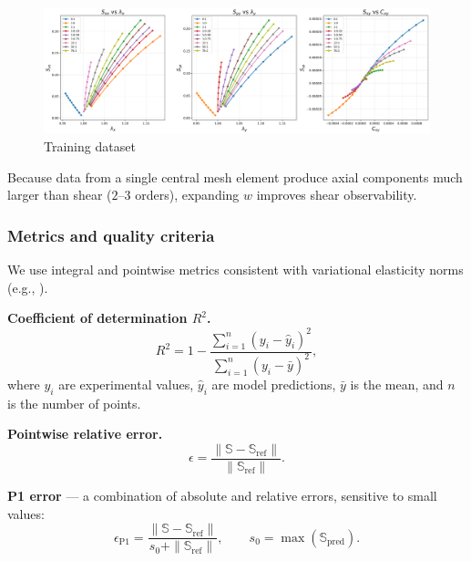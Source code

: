 \begin{figure}[H]
  \centering
\includegraphics[width=1.0\textwidth]{../img/all_stress_plots.png}
\caption{Training dataset}
  \label{fig:training_data}
\end{figure}

Because data from a single central mesh element produce axial components much larger than shear ($2$--$3$ orders), expanding $w$ improves shear observability.

\subsubsection{Metrics and quality criteria}
\label{sec:metrics}

We use integral and pointwise metrics consistent with variational elasticity norms (e.g., \cite{ciarlet1988mathematical,ogden1997nonlinear,holzapfel2000nonlinear}).

\textbf{Coefficient of determination $R^2$.}
\begin{equation}\label{eq:r_squared}
  R^2 = 1 - \frac{\sum_{i=1}^n (y_i - \hat{y}_i)^2}{\sum_{i=1}^n (y_i - \bar{y})^2},
\end{equation}
where $y_i$ are experimental values, $\hat{y}_i$ are model predictions, $\bar{y}$ is the mean, and $n$ is the number of points.

\textbf{Pointwise relative error.}
\begin{equation}\label{eq:rel_error}
  \epsilon = \frac{\| \mathbb S - \mathbb S_{\text{ref}} \|}{\| \mathbb S_{\text{ref}} \|}.
\end{equation}

\textbf{P1 error} \cite{xie2024p1} — a combination of absolute and relative errors, sensitive to small values:
\begin{equation}\label{eq:p1_error}
  \epsilon_{\mathrm{P1}} = \frac{\| \mathbb S - \mathbb S_{\text{ref}} \|}{s_0 + \| \mathbb S_{\text{ref}} \|},\qquad s_0 = \max(\mathbb S_{\text{pred}}).
\end{equation}


